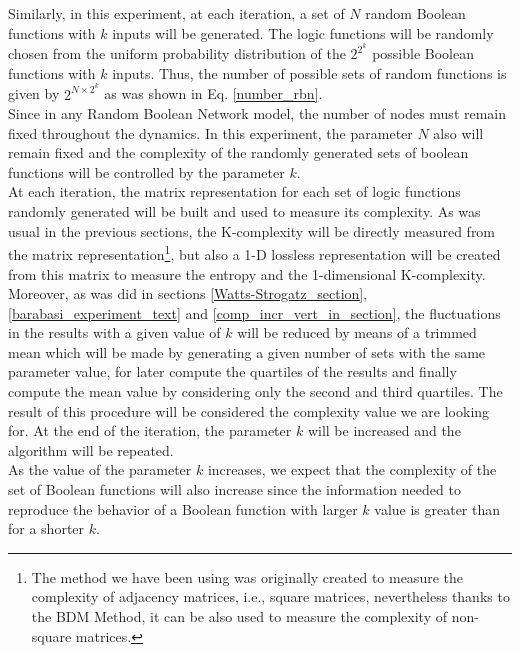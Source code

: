 Similarly, in this experiment, at each iteration, a set of $N$ random Boolean functions with $k$ inputs will be generated. The logic functions will be randomly chosen from the uniform probability distribution of the $2^{2^{k}}$ possible Boolean functions with $k$ inputs. Thus, the number of possible sets of random functions is given by $2^{N \times 2^{k}}$ as was shown in Eq. \ref{number_rbn}.\\

Since in any Random Boolean Network model, the number of nodes must remain fixed throughout the dynamics. In this experiment, the parameter $N$ also will remain fixed and the complexity of the randomly generated sets of boolean functions will be controlled by the parameter $k$.\\

At each iteration, the matrix representation for each set of logic functions randomly generated will be built and used to measure its complexity. As was usual in the previous sections, the K-complexity will be directly measured from the matrix representation\footnote{The method we have been using was originally created to measure the complexity of adjacency matrices, i.e., square matrices, nevertheless thanks to the BDM Method, it can be also used to measure the complexity of non-square matrices.}, but also a 1-D lossless representation will be created from this matrix to measure the entropy and the 1-dimensional K-complexity. Moreover, as was did in sections \ref{Watts-Strogatz_section}, \ref{barabasi_experiment_text} and \ref{comp_incr_vert_in_section}, the fluctuations in the results with a given value of $k$ will be reduced by means of a trimmed mean which will be made by generating a given number of sets with the same parameter value, for later compute the quartiles of the results and finally compute the mean value by considering only the second and third quartiles. The result of this procedure will be considered the complexity value we are looking for. At the end of the iteration, the parameter $k$ will be increased and the algorithm will be repeated.\\

As the value of the parameter $k$ increases, we expect that the complexity of the set of Boolean functions will also increase since the information needed to reproduce the behavior of a Boolean function with larger $k$ value is greater than for a shorter $k$.\\


